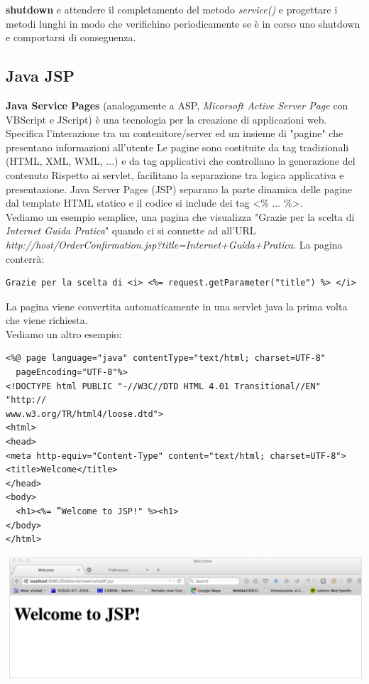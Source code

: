 \documentclass[a4paper,12pt, oneside]{book}
\begin{document}
\textbf{shutdown} e attendere il completamento del metodo \textit{service()} e progettare i metodi lunghi in modo che verifichino periodicamente
se è in corso uno shutdown e comportarsi di conseguenza.
\subsection{Java JSP}
\textbf{Java Service Pages} (analogamente a ASP, \textit{Micorsoft Active Server Page} con VBScript e JScript) è una tecnologia per la creazione di applicazioni web. Specifica l'interazione tra un contenitore/server ed un insieme di "pagine" che presentano informazioni all’utente
Le pagine sono costituite da tag tradizionali (HTML, XML,
WML, ...) e da tag applicativi che controllano la generazione
del contenuto Rispetto ai servlet, facilitano la separazione tra logica applicativa e presentazione. Java Server Pages (JSP) separano la parte dinamica delle pagine dal template HTML statico e il codice si include dei tag <\% ... \%>.\\ Vediamo un esempio semplice, una pagina che visualizza "Grazie per la scelta di \textit{Internet Guida Pratica}" quando ci si connette ad  all'URL \textit{http://host/OrderConfirmation.jsp?title=Internet+Guida+Pratica}. La pagina conterrà:
\begin{verbatim}
Grazie per la scelta di <i> <%= request.getParameter("title") %> </i>
\end{verbatim} 
La pagina viene convertita automaticamente in una servlet java la prima volta che viene richiesta.\\
Vediamo un altro esempio:
\begin{verbatim}
<%@ page language="java" contentType="text/html; charset=UTF-8"
  pageEncoding="UTF-8"%>
<!DOCTYPE html PUBLIC "-//W3C//DTD HTML 4.01 Transitional//EN" "http://
www.w3.org/TR/html4/loose.dtd">
<html>
<head>
<meta http-equiv="Content-Type" content="text/html; charset=UTF-8">
<title>Welcome</title>
</head>
<body>
  <h1><%= ”Welcome to JSP!" %><h1>
</body>
</html>
\end{verbatim}
\begin{center}
	\includegraphics[scale=0.7]{img/jsp.png}
\end{center}
\end{document}
